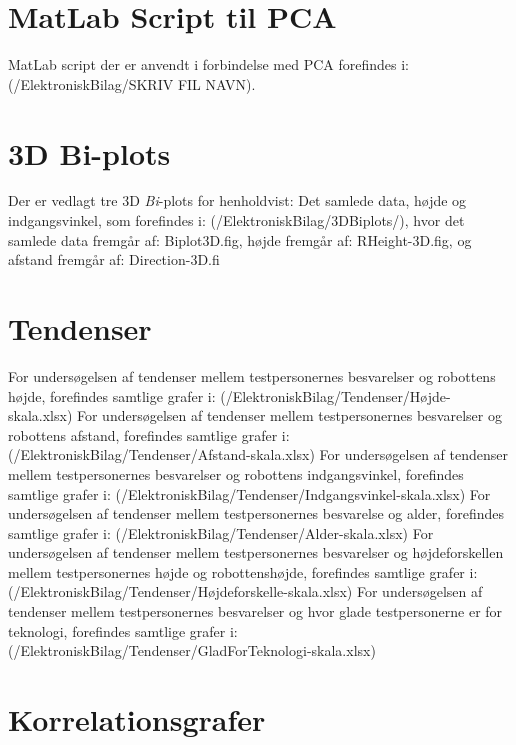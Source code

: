 \section{MatLab Script til PCA}
\label{ElektroniskBilagMatLabPCA}
%
MatLab script der er anvendt i forbindelse med PCA forefindes i: (/ElektroniskBilag/SKRIV FIL NAVN).


\section{3D Bi-plots}
\label{ElektroniskBilag3D}
%
Der er vedlagt tre 3D \textit{Bi}-plots for henholdvist: Det samlede data, højde og indgangsvinkel, som forefindes i: (/ElektroniskBilag/3DBiplots/), hvor det samlede data fremgår af: Biplot3D.fig, højde fremgår af: RHeight-3D.fig, og afstand fremgår af: Direction-3D.fi

\section{Tendenser}
\label{ElektroniskBilagTendenser}
%
For undersøgelsen af tendenser mellem testpersonernes besvarelser og robottens højde, forefindes samtlige grafer i: (/ElektroniskBilag/Tendenser/Højde-skala.xlsx)\blankline
%
For undersøgelsen af tendenser mellem testpersonernes besvarelser og robottens afstand, forefindes samtlige grafer i: (/ElektroniskBilag/Tendenser/Afstand-skala.xlsx)\blankline
%
For undersøgelsen af tendenser mellem testpersonernes besvarelser og robottens indgangsvinkel, forefindes samtlige grafer i: (/ElektroniskBilag/Tendenser/Indgangsvinkel-skala.xlsx)\blankline
%
For undersøgelsen af tendenser mellem testpersonernes besvarelse og alder, forefindes samtlige grafer i: (/ElektroniskBilag/Tendenser/Alder-skala.xlsx)\blankline
%
For undersøgelsen af tendenser mellem testpersonernes besvarelser og højdeforskellen mellem testpersonernes højde og robottenshøjde, forefindes samtlige grafer i: (/ElektroniskBilag/Tendenser/Højdeforskelle-skala.xlsx)\blankline
%
For undersøgelsen af tendenser mellem testpersonernes besvarelser og hvor glade testpersonerne er for teknologi, forefindes samtlige grafer i: (/ElektroniskBilag/Tendenser/GladForTeknologi-skala.xlsx)

\section{Korrelationsgrafer}
\label{ElektroniskBilagKorrelationsgrafer}
%



